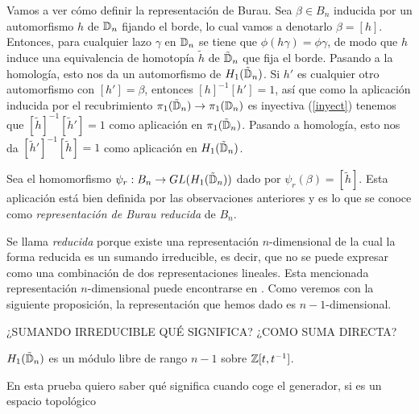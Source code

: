 \documentclass[TFG.tex]{subfiles}
\begin{document}
Vamos a ver cómo definir la representación de Burau. Sea $\beta\in B_n$ inducida por un automorfismo $h$ de $\mathbb{D}_n$ fijando el borde, lo cual vamos a denotarlo $\beta=[h]$. Entonces, para cualquier lazo $\gamma$ en $\mathbb{D}_n$ se tiene que $\phi(h\gamma)=\phi\gamma$, de modo que $h$ induce una equivalencia de homotopía \cite{Hatcher} $\tilde{h}$ de $\tilde{\mathbb{D}}_n$ que fija el borde. Pasando a la homología, esto nos da un automorfismo de $H_1(\tilde{\mathbb{D}}_n)$. Si $h'$ es cualquier otro automorfismo con $[h']=\beta$, entonces $[h]^{-1}[h']=1$, así que como la aplicación inducida por el recubrimiento $\pi_1(\tilde{\mathbb{D}}_n)\to\pi_1(\mathbb{D}_n)$ es inyectiva (\ref{inyect}) tenemos que $[\tilde{h}]^{-1}[\tilde{h}']=1$ como aplicación en $\pi_1(\tilde{\mathbb{D}}_n)$. Pasando a homología, esto nos da $[\tilde{h}']^{-1}[\tilde{h}]=1$ como aplicación en $H_1(\tilde{\mathbb{D}}_n)$. 






\begin{defi}
Sea el homomorfismo $\psi_r:B_n\to GL(H_1(\tilde{\mathbb{D}}_n))$ dado por $\psi_r(\beta)=[\tilde{h}]$. Esta aplicación está bien definida por las observaciones anteriores y es lo que se conoce como \emph{representación de Burau reducida} de $B_n$.
\end{defi}

Se llama \emph{reducida} porque existe una representación $n$-dimensional de la cual la forma reducida es un sumando irreducible, es decir, que no se puede expresar como una combinación de dos representaciones lineales. Esta mencionada representación $n$-dimensional puede encontrarse en \cite{thesis}. Como veremos con la siguiente proposición, la representación que hemos dado es $n-1$-dimensional.

¿SUMANDO IRREDUCIBLE QUÉ SIGNIFICA? ¿COMO SUMA DIRECTA?

\begin{prop}
$H_1(\tilde{\mathbb{D}}_n)$ es un módulo libre de rango $n-1$ sobre $\mathbb{Z}[t,t^{-1}]$.
\end{prop}
\begin{dem}
En esta prueba quiero saber qué significa cuando coge el generador, si es un espacio topológico
\end{dem}
\end{document}
